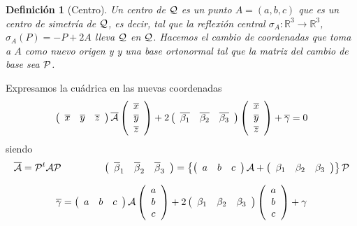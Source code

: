 \documentclass[11pt, a4paper]{article}
\newif\IfInSansMode
\theoremstyle{theorem-style}
\theoremstyle{definition-style}
\newtheorem{ndef}{Definición}[section]
\theoremstyle{remark-style}
\theoremstyle{example-style}
\begin{document}
\begin{ndef}[Centro]
	Un {\it centro} de $\cal Q$ es un punto $A=(a,b,c)$ que es un centro de simetr\'ia de $\cal Q$, es decir, tal que la reflexi\'on central $\sigma_A:\mathbb{R}^3\longrightarrow\mathbb{R}^3$, $\sigma_A(P)= -P+2A$ lleva  $\cal Q$ en $\cal Q$. Hacemos el cambio de coordenadas que toma a $A$ como nuevo origen y 
y una base ortonormal tal que la matriz del cambio de base sea $\cal P$.
\end{ndef}


Expresamos la cu\'adrica en las nuevas coordenadas
\[ 
\left( \begin{array}{ccc} 
\overline{x} & \overline{y} & \overline{z}   
 \end{array} \right)\overline{{\cal A}}
\left(\begin{array}{c}
\overline{x} \\
\overline{y} \\
\overline{z}  
\end{array} \right)
+
2
 \left( \begin{array}{ccc}
\overline{\beta_1} & \overline{\beta_2} & \overline{\beta_3}   
 \end{array} \right)
\left( \begin{array}{c}
\overline{x} \\
\overline{y} \\
\overline{z}  
 \end{array} \right)
+ \overline{\gamma} = 0
\]
siendo
\[
\overline{{\cal A}} = {\cal P}^t{\cal A}{\cal P} \hspace{1.5cm}
\left( \begin{array}{ccc}
\overline{\beta}_1 & \overline{\beta}_2 & \overline{\beta}_3   
 \end{array} \right) = 
  \left\{
\left( \begin{array}{ccc} 
a &  b &  c 
 \end{array} \right){\cal A} +
 \left( \begin{array}{ccc}
\beta_1 & \beta_2 & \beta_3   
 \end{array} \right) \right\}
{\cal P}
\]


\[
 \overline{\gamma} = \left( \begin{array}{ccc} 
a &  b & c 
 \end{array} \right){\cal A}
\left(\begin{array}{c}
a  \\
b \\
c  
\end{array} \right)  + 
2 \left( \begin{array}{ccc}
\beta_1 & \beta_2 & \beta_3   
 \end{array} \right)
\left( \begin{array}{c}
a \\
b \\
c  
 \end{array} \right)
+ \gamma
\]
\end{document}
